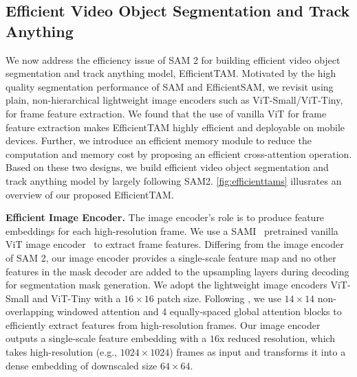 \subsection{Efficient Video Object Segmentation and Track Anything} 
We now address the efficiency issue of SAM 2 for building efficient video object segmentation and track anything model, EfficientTAM. Motivated by the high quality segmentation performance of SAM and EfficientSAM, we revisit using plain, non-hierarchical lightweight image encoders such as ViT-Small/ViT-Tiny, for frame feature extraction. We found that the use of vanilla ViT for frame feature extraction makes EfficientTAM highly efficient and deployable on mobile devices. Further, we introduce an efficient memory module to reduce the computation and memory cost by proposing an efficient cross-attention operation. Based on these two designs, we build efficient video object segmentation and track anything model by largely following SAM2.  \cref{fig:efficienttams} illusrates an overview of our proposed EfficientTAM. 

\noindent \textbf{Efficient Image Encoder.} The image encoder's role is to produce feature embeddings for each high-resolution frame. We use a SAMI~\citep{xiong2024efficientsam} pretrained vanilla ViT image encoder~\citep{dosovitskiy2020image,touvron2021training} to extract frame features. Differing from the image encoder of SAM 2, our image encoder provides a single-scale feature map and no other features in the mask decoder are added to the upsampling layers during decoding for segmentation mask generation. We adopt the lightweight image encoders ViT-Small and ViT-Tiny with a $16\times 16$ patch size. Following \citep{li2022exploring}, we use $14\times 14$ non-overlapping windowed attention and 4 equally-spaced global attention blocks to efficiently extract features from high-resolution frames. Our image encoder outputs a single-scale feature embedding with a $16$x reduced resolution, which takes high-resolution (e.g., $1024\times 1024$) frames as input and transforms it into a dense embedding of downscaled size $64\times 64$. 

